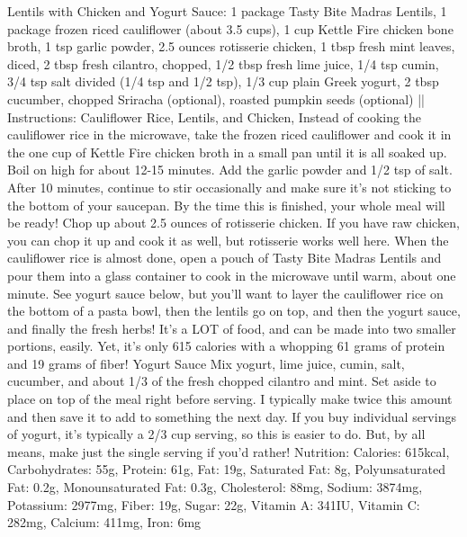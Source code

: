 Lentils with Chicken and Yogurt Sauce: 1 package Tasty Bite Madras Lentils, 1 package frozen riced cauliflower (about 3.5 cups), 1 cup Kettle Fire chicken bone broth, 1 tsp garlic powder, 2.5 ounces rotisserie chicken, 1 tbsp fresh mint leaves, diced, 2 tbsp fresh cilantro, chopped, 1/2 tbsp fresh lime juice, 1/4 tsp cumin, 3/4 tsp salt divided (1/4 tsp and 1/2 tsp), 1/3 cup plain Greek yogurt, 2 tbsp cucumber, chopped Sriracha (optional), roasted pumpkin seeds (optional) || Instructions: Cauliflower Rice, Lentils, and Chicken, Instead of cooking the cauliflower rice in the microwave, take the frozen riced cauliflower and cook it in the one cup of Kettle Fire chicken broth in a small pan until it is all soaked up. Boil on high for about 12-15 minutes. Add the garlic powder and 1/2 tsp of salt. After 10 minutes, continue to stir occasionally and make sure it's not sticking to the bottom of your saucepan. By the time this is finished, your whole meal will be ready! Chop up about 2.5 ounces of rotisserie chicken. If you have raw chicken, you can chop it up and cook it as well, but rotisserie works well here. When the cauliflower rice is almost done, open a pouch of Tasty Bite Madras Lentils and pour them into a glass container to cook in the microwave until warm, about one minute. See yogurt sauce below, but you'll want to layer the cauliflower rice on the bottom of a pasta bowl, then the lentils go on top, and then the yogurt sauce, and finally the fresh herbs! It's a LOT of food, and can be made into two smaller portions, easily. Yet, it's only 615 calories with a whopping 61 grams of protein and 19 grams of fiber! Yogurt Sauce Mix yogurt, lime juice, cumin, salt, cucumber, and about 1/3 of the fresh chopped cilantro and mint. Set aside to place on top of the meal right before serving. I typically make twice this amount and then save it to add to something the next day. If you buy individual servings of yogurt, it's typically a 2/3 cup serving, so this is easier to do. But, by all means, make just the single serving if you'd rather! Nutrition: Calories: 615kcal, Carbohydrates: 55g, Protein: 61g, Fat: 19g, Saturated Fat: 8g, Polyunsaturated Fat: 0.2g, Monounsaturated Fat: 0.3g, Cholesterol: 88mg, Sodium: 3874mg, Potassium: 2977mg, Fiber: 19g, Sugar: 22g, Vitamin A: 341IU, Vitamin C: 282mg, Calcium: 411mg, Iron: 6mg
\par

